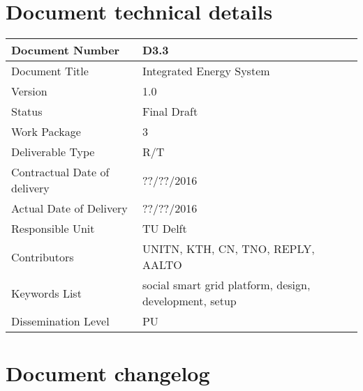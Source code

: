 
\section*{Document technical details}

\begin{tabularx}{\textwidth}{|X|X|}
\hline
Document Number	& D3.3 \\ \hline
Document Title	&  Integrated Energy System\\ \hline
Version	&  1.0\\ \hline
Status	 &  Final Draft\\ \hline
Work Package		&  3\\ \hline
Deliverable Type 	&  R/T \\ \hline
Contractual Date of delivery 	&  ??/??/2016 \\ \hline
Actual Date of Delivery		&  ??/??/2016 \\ \hline
Responsible Unit	&  TU Delft \\ \hline
Contributors & UNITN, KTH, CN, TNO, REPLY, AALTO  \\ \hline
Keywords List &  social smart grid platform, design, development, setup\\ \hline
Dissemination Level	&  PU \\ \hline
\end{tabularx}

\clearpage

\section*{Document changelog}

